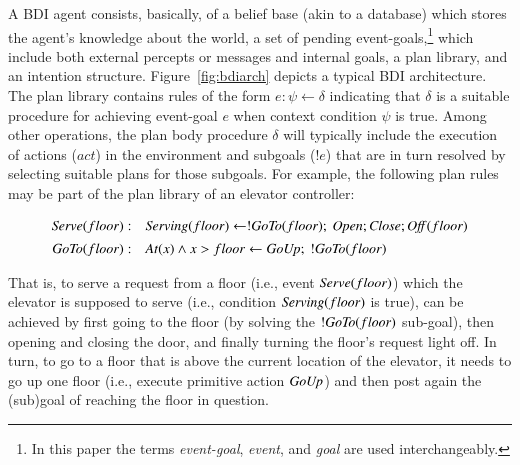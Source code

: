 
A BDI agent consists, basically, of a belief base (akin to a database) which
stores the agent's knowledge about the world, a set of pending
event-goals,\footnote{In this paper the terms {\em event-goal}, {\em event}, and
{\em goal} are used interchangeably.} which include both external percepts or
messages and internal goals, a plan library, and an intention structure.
Figure~\ref{fig:bdiarch} depicts a typical BDI architecture.
The plan library contains rules of the form $e: \psi \leftarrow \delta$
indicating that $\delta$ is a suitable procedure for achieving event-goal $e$
when context condition $\psi$ is true.
Among other operations, the plan body procedure $\delta$ will typically include
the execution of actions ($act$) in the environment and subgoals ($!e$) that are
in turn resolved by selecting suitable plans for those subgoals.
For example, the following plan rules may be part of the plan library of an
elevator controller:

\[
\begin{array}{rl}
\mbox{\textit{Serve}}(floor)  : &  \mbox{\textit{Serving}}(floor) \leftarrow 
	!\mbox{\textit{GoTo}}(floor);\ \mbox{\textit{Open}}; \mbox{\textit{Close}}; \mbox{\textit{Off}}(floor) \\[1ex] 
\mbox{\textit{GoTo}}(floor)  : & \mbox{\textit{At}}(x) \land x>floor \leftarrow \mbox{\textit{GoUp}};\ !\mbox{\textit{GoTo}}(floor)
\end{array}
\]

That is, to serve a request from a floor (i.e., event $\mbox{\textit{Serve}}(floor)$)
which the elevator is supposed to serve (i.e., condition $\mbox{\textit{Serving}}(floor)$ is
true), can be achieved by first going to the floor (by solving the
$!\mbox{\textit{GoTo}}(floor)$ sub-goal), then opening and closing the door, and finally
turning the floor's request light off.
In turn, to go to a floor that is above the current location of the elevator,
it needs to go up one floor (i.e., execute primitive action $\mbox{\textit{GoUp}}$) and then
post again the (sub)goal of reaching the floor in question.






